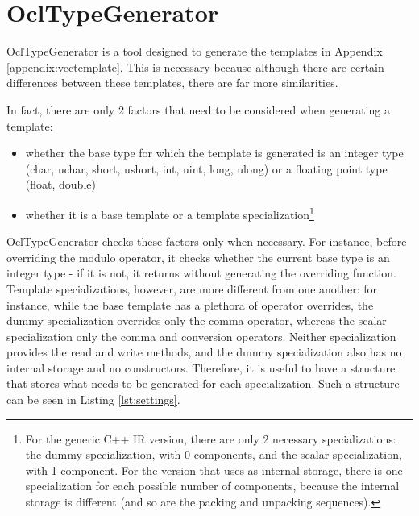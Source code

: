 \chapter{OclTypeGenerator}
\label{appendix:generator}

OclTypeGenerator is a tool designed to generate the templates in Appendix \ref{appendix:vectemplate}. This is necessary because although there are certain differences between these templates, there are far more similarities. 

In fact, there are only 2 factors that need to be considered when generating a template:
\begin{itemize}
\item whether the base type for which the template is generated is an integer type (char, uchar, short, ushort, int, uint, long, ulong) or a floating point type (float, double)
\item whether it is a base template or a template specialization\footnote{For the generic C++ IR version, there are only 2 necessary specializations: the dummy specialization, with 0 components, and the scalar specialization, with 1 component. For the version that uses \vectype{} as internal storage, there is one specialization for each possible number of components, because the internal storage is different (and so are the packing and unpacking sequences).}
\end{itemize}

OclTypeGenerator checks these factors only when necessary. For instance, before overriding the modulo operator, it checks whether the current base type is an integer type - if it is not, it returns without generating the overriding function. Template specializations, however, are more different from one another: for instance, while the base template has a plethora of operator overrides, the dummy specialization overrides only the comma operator, whereas the scalar specialization only the comma and conversion operators. Neither specialization provides the read and write methods, and the dummy specialization also has no internal storage and no constructors. Therefore, it is useful to have a structure that stores what needs to be generated for each specialization. Such a structure can be seen in Listing \ref{lst:settings}.

